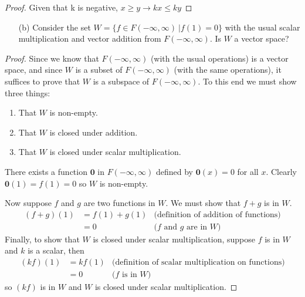 \documentclass[12pt]{article}
\begin{document}
\begin{enumerate}
\begin{proof}
                      Given that k is negative, ${x\geq y} \rightarrow {kx\leq ky}$
              \end{proof}
              \pagebreak
              \begin{enumerate}
                      \subsection{Answer: Yes, $W$ is a vector space.}
                      \item[(b)] Consider the set $W = \{f \in F(-\infty, \infty) \ | f(1) = 0\}$
                            with the usual scalar multiplication and vector addition from
                            $F(-\infty, \infty)$.
                            Is $W$ a vector space?
              \end{enumerate}
              \begin{proof}
                      Since we know that $F(-\infty, \infty)$ (with the usual operations) is a vector space,
                      and since $W$ is a subset of $F(-\infty, \infty)$ (with the same operations),
                      it suffices to prove that $W$ is a subspace of $F(-\infty, \infty)$.
                      To this end we must show three things:
                      \begin{enumerate}
                              \item That $W$ is non-empty.
                              \item That $W$ is closed under addition.
                              \item That $W$ is closed under scalar multiplication.
                      \end{enumerate}
                      There exists a function $\mathbf{0}$ in $F(-\infty, \infty)$
                      defined by $\mathbf{0}(x)=0$ for all $x$.
                      Clearly $\mathbf{0}(1)=f(1)=0$ so $W$ is non-empty.

                      Now suppose $f$ and $g$ are two functions in $W$. We must show that $f+g$ is in $W$.
                      \begin{align*}
                              (f+g)(1) & = f(1) + g(1) & \textrm{(definition of addition of functions)} \\
                                       & = 0           & \textrm{($f$ and $g$ are in $W$)}
                      \end{align*}
                      Finally, to show that $W$ is closed under scalar multiplication,
                      suppose $f$ is in $W$ and $k$ is a scalar, then
                      \begin{align*}
                              (kf)(1) & = kf(1) & \textrm{(definition of scalar multiplication on functions)} \\
                                      & = 0     & \textrm{($f$ is in $W$)}
                      \end{align*}
                      so $(kf)$ is in $W$ and $W$ is closed under scalar multiplication.


\end{proof}
\end{enumerate}
\end{document}
